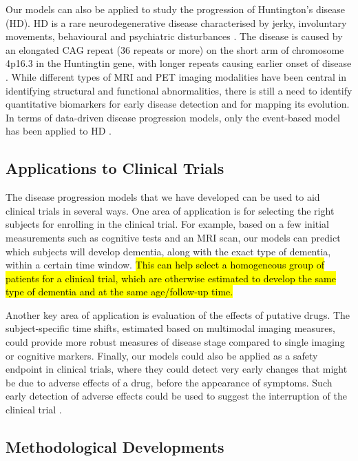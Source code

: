 Our models can also be applied to study the progression of Huntington's disease (HD). HD is a rare neurodegenerative disease characterised by jerky, involuntary movements, behavioural and psychiatric disturbances \cite{roos2010huntington}. The disease is caused by an elongated CAG repeat (36 repeats or more) on the short arm of chromosome 4p16.3 in the Huntingtin gene, with longer repeats causing earlier onset of disease \cite{roos2010huntington}. While different types of MRI \cite{georgiou2008magnetic} and PET \cite{feigin2001metabolic} imaging modalities have been central in identifying structural and functional abnormalities, there is still a need to identify quantitative biomarkers for early disease detection and for mapping its evolution\cite{georgiou2008magnetic}. In terms of data-driven disease progression models, only the event-based model has been applied to HD \cite{fonteijn2012event, wijeratne2018image}.


\subsection{Applications to Clinical Trials}
\label{sec:conCli}

The disease progression models that we have developed can be used to aid clinical trials in several ways. One area of application is for selecting the right subjects for enrolling in the clinical trial. For example, based on a few initial measurements such as cognitive tests and an MRI scan, our models can predict which subjects will develop dementia, along with the exact type of dementia, within a certain time window. \hl{This can help select a homogeneous group of patients for a clinical trial, which are otherwise estimated to develop the same type of dementia and at the same age/follow-up time. }

Another key area of application is evaluation of the effects of putative drugs. The subject-specific time shifts, estimated based on multimodal imaging measures, could provide more robust measures of disease stage compared to single imaging or cognitive markers. Finally, our models could also be applied as a safety endpoint in clinical trials, where they could detect very early changes that might be due to adverse effects of a drug, before the appearance of symptoms. Such early detection of adverse effects could be used to suggest the interruption of the clinical trial \cite{cash2014imaging}. 

\subsection{Methodological Developments}
\label{sec:conMet}


